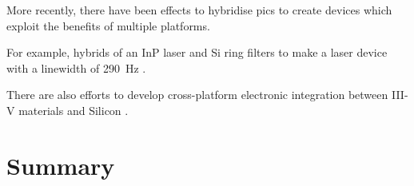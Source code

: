 More recently, there have been effects to hybridise \acp{pic} to create devices which exploit the benefits of multiple platforms. 

For example, hybrids of an \ac{InP} laser and Si ring filters to make a laser device with a linewidth of \SI{290}{Hz} \cite{Fan2017}.

There are also efforts to develop cross-platform electronic integration between III-V materials and Silicon \cite{}. 

\section{Summary}


